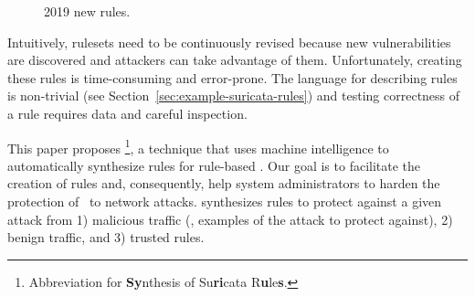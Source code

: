 \documentclass[sigconf,review, anonymous]{acmart}
\begin{document}
\begin{figure}
    \vspace{-5ex}  
    \centering
    \vspace{-4ex}
    \caption{\label{fig:distribution-rules-per-month}2019 new rules.}
\end{figure}%

Intuitively, rulesets need to be continuously revised because new
vulnerabilities are discovered and attackers can take advantage of
them. Unfortunately, creating these rules is time-consuming and
error-prone. The language for describing rules is non-trivial (see
Section~\ref{sec:example-suricata-rules}) and testing correctness of a
rule requires data and careful inspection.



This paper proposes \tname{}\footnote{Abbreviation for
  \textbf{Sy}nthesis of Su\textbf{ri}cata R\textbf{u}le\textbf{s}.}, a
technique that uses machine intelligence to automatically synthesize
rules for rule-based \nids. Our goal is to facilitate the creation of
rules and, consequently, help system administrators to harden the
protection of \nids\ to network attacks. \tname{} synthesizes rules to
protect against a given attack from 1) malicious traffic (\ie{},
examples of the attack to protect against), 2) benign traffic, and 3)
trusted rules.
\end{document}
